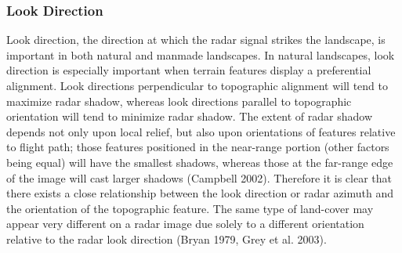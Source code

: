 \subsubsection*{Look Direction}
Look direction, the direction at which the radar signal strikes the landscape, is important in both natural and manmade landscapes. In natural landscapes, look direction is especially important when terrain features display a preferential alignment. Look directions perpendicular to topographic alignment will tend to maximize radar shadow, whereas look directions parallel to topographic orientation will tend to minimize radar shadow. The extent of radar shadow depends not only upon local relief, but also upon orientations of features relative to flight path; those features positioned in the near-range portion (other factors being equal) will have the smallest shadows, whereas those at the far-range edge of the image will cast larger shadows (Campbell 2002). Therefore it is clear that there exists a close relationship between the look direction or radar azimuth and the orientation of the topographic feature. The same type of land-cover may appear very different on a radar image due solely to a different orientation relative to the radar look direction (Bryan 1979, Grey et al. 2003). 
